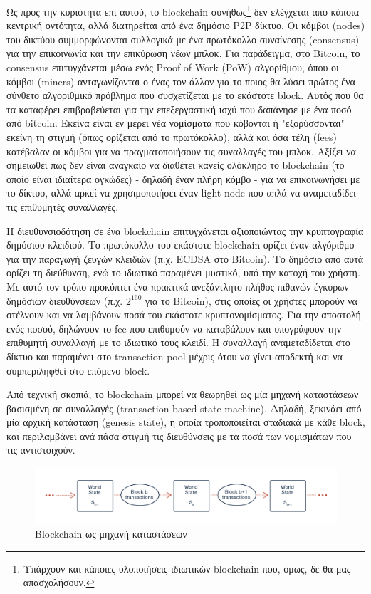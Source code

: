 Ως προς την κυριότητα επί αυτού, το blockchain συνήθως\footnote{Υπάρχουν και κάποιες υλοποιήσεις ιδιωτικών blockchain που, όμως, δε θα μας απασχολήσουν.} δεν ελέγχεται από κάποια κεντρική οντότητα, αλλά διατηρείται από ένα δημόσιο P2P δίκτυο. Οι κόμβοι (nodes) του δικτύου συμμορφώνονται συλλογικά με ένα πρωτόκολλο συναίνεσης (consensus) για την επικοινωνία και την επικύρωση νέων μπλοκ. Για παράδειγμα, στο Bitcoin, το consensus επιτυγχάνεται μέσω ενός Proof of Work (PoW) αλγορίθμου, όπου οι κόμβοι (miners) ανταγωνίζονται ο ένας τον άλλον για το ποιος θα λύσει πρώτος ένα σύνθετο αλγοριθμικό πρόβλημα που συσχετίζεται με το εκάστοτε block. Αυτός που θα τα καταφέρει επιβραβεύεται για την επεξεργαστική ισχύ που δαπάνησε με ένα ποσό από bitcoin. Εκείνα είναι εν μέρει νέα νομίσματα που κόβονται ή "εξορύσσονται" εκείνη τη στιγμή (όπως ορίζεται από το πρωτόκολλο), αλλά και όσα τέλη (fees) κατέβαλαν οι κόμβοι για να πραγματοποιήσουν τις συναλλαγές του μπλοκ. Αξίζει να σημειωθεί πως δεν είναι αναγκαίο να διαθέτει κανείς ολόκληρο το blockchain (το οποίο είναι ιδιαίτερα ογκώδες) - δηλαδή έναν πλήρη κόμβο - για να επικοινωνήσει με το δίκτυο, αλλά αρκεί να χρησιμοποιήσει έναν light node που απλά να αναμεταδίδει τις επιθυμητές συναλλαγές.

Η διευθυνσιοδότηση σε ένα blockchain επιτυγχάνεται αξιοποιώντας την κρυπτογραφία δημόσιου κλειδιού. Το πρωτόκολλο του εκάστοτε blockchain ορίζει έναν αλγόριθμο για την παραγωγή ζευγών κλειδιών (π.χ. ECDSA στο Bitcoin). Το δημόσιο από αυτά ορίζει τη διεύθυνση, ενώ το ιδιωτικό παραμένει μυστικό, υπό την κατοχή του χρήστη. Με αυτό τον τρόπο προκύπτει ένα πρακτικά ανεξάντλητο πλήθος πιθανών έγκυρων δημόσιων διευθύνσεων (π.χ. $2^{160}$ για το Bitcoin), στις οποίες οι χρήστες μπορούν να στέλνουν και να λαμβάνουν ποσά του εκάστοτε κρυπτονομίσματος. Για την αποστολή ενός ποσού, δηλώνουν το fee που επιθυμούν να καταβάλουν και υπογράφουν την επιθυμητή συναλλαγή με το ιδιωτικό τους κλειδί. Η συναλλαγή αναμεταδίδεται στο δίκτυο και παραμένει στο transaction pool μέχρις ότου να γίνει αποδεκτή και να συμπεριληφθεί στο επόμενο block.

Από τεχνική σκοπιά, το blockchain μπορεί να θεωρηθεί ως μία μηχανή καταστάσεων βασισμένη σε συναλλαγές (transaction-based state machine). Δηλαδή, ξεκινάει από μία αρχική κατάσταση (genesis state), η οποία τροποποιείται σταδιακά με κάθε block, και περιλαμβάνει ανά πάσα στιγμή τις διευθύνσεις με τα ποσά των νομισμάτων που τις αντιστοιχούν.

\begin{figure}[H]
	\centering
	\includegraphics[width=.95\textwidth]{assets/figures/chapter-2/2.3.blockchain.world.state}
	\caption{Blockchain ως μηχανή καταστάσεων}
\end{figure}

